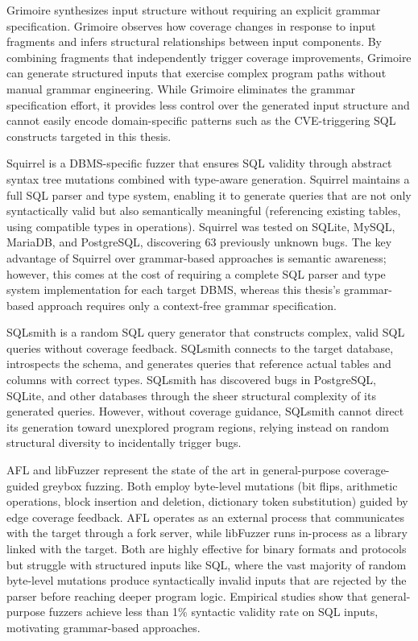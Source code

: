 Grimoire \cite{grimoire} synthesizes input structure without requiring an explicit grammar specification. Grimoire observes how coverage changes in response to input fragments and infers structural relationships between input components. By combining fragments that independently trigger coverage improvements, Grimoire can generate structured inputs that exercise complex program paths without manual grammar engineering. While Grimoire eliminates the grammar specification effort, it provides less control over the generated input structure and cannot easily encode domain-specific patterns such as the CVE-triggering SQL constructs targeted in this thesis.

Squirrel \cite{squirrel} is a DBMS-specific fuzzer that ensures SQL validity through abstract syntax tree mutations combined with type-aware generation. Squirrel maintains a full SQL parser and type system, enabling it to generate queries that are not only syntactically valid but also semantically meaningful (referencing existing tables, using compatible types in operations). Squirrel was tested on SQLite, MySQL, MariaDB, and PostgreSQL, discovering 63 previously unknown bugs. The key advantage of Squirrel over grammar-based approaches is semantic awareness; however, this comes at the cost of requiring a complete SQL parser and type system implementation for each target DBMS, whereas this thesis's grammar-based approach requires only a context-free grammar specification.

SQLsmith \cite{sqlsmith} is a random SQL query generator that constructs complex, valid SQL queries without coverage feedback. SQLsmith connects to the target database, introspects the schema, and generates queries that reference actual tables and columns with correct types. SQLsmith has discovered bugs in PostgreSQL, SQLite, and other databases through the sheer structural complexity of its generated queries. However, without coverage guidance, SQLsmith cannot direct its generation toward unexplored program regions, relying instead on random structural diversity to incidentally trigger bugs.

AFL \cite{afl} and libFuzzer \cite{libfuzzer} represent the state of the art in general-purpose coverage-guided greybox fuzzing. Both employ byte-level mutations (bit flips, arithmetic operations, block insertion and deletion, dictionary token substitution) guided by edge coverage feedback. AFL operates as an external process that communicates with the target through a fork server, while libFuzzer runs in-process as a library linked with the target. Both are highly effective for binary formats and protocols but struggle with structured inputs like SQL, where the vast majority of random byte-level mutations produce syntactically invalid inputs that are rejected by the parser before reaching deeper program logic. Empirical studies show that general-purpose fuzzers achieve less than 1\% syntactic validity rate on SQL inputs, motivating grammar-based approaches.

